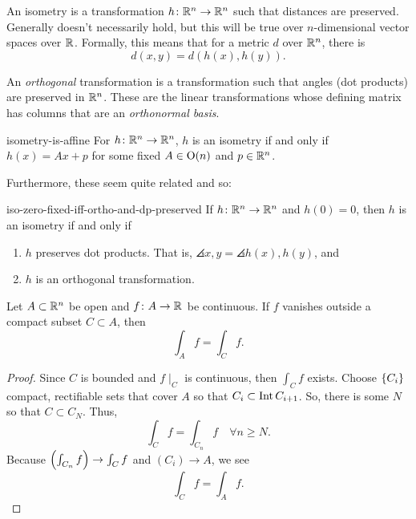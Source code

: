 \documentclass{article}
\begin{document}
An isometry is a transformation $h \from \RR[n] \to \RR[n]$ such that distances are preserved.
Generally doesn't necessarily hold, but this will be true over $n$-dimensional vector spaces over $\RR$.
Formally, this means that for a metric $d$ over $\RR[n]$, there is
\[ d(x, y) = d(h(x), h(y)). \]

An \emph{orthogonal} transformation is a transformation such that angles (dot products) are preserved in $\RR[n]$.
These are the linear transformations whose defining matrix has columns that are an \emph{orthonormal basis}.

\begin{theorem}{}{isometry-is-affine}
  For $h \from \RR[n] \to \RR[n]$, $h$ is an isometry if and only if $h(x) = Ax + p$
  for some fixed $A \in \Orth(n)$ and $p \in \RR[n]$.
\end{theorem}

Furthermore, these seem quite related and so:

\begin{theorem}{}{iso-zero-fixed-iff-ortho-and-dp-preserved}
  If $h \from \RR[n] \to \RR[n]$ and $h(0) = 0$, then $h$ is an isometry if and only if
  \begin{enumerate}[start=1,label={\arabic*\rparen}]
    \item $h$ preserves dot products. That is, $\angles{x, y} = \angles{h(x), h(y)}$, and
    \item $h$ is an orthogonal transformation.
  \end{enumerate}
\end{theorem}

\begin{lemma}{}{}
  Let $A \subset \RR[n]$ be open and $f \from A \to \RR$ be continuous.
  If $f$ vanishes outside a compact subset $C \subset A$, then
  \[ \int_{A}f = \int_{C}f. \]
\end{lemma}
\begin{proof}
  Since $C$ is bounded and $f\mid_{C}$ is continuous, then $\int_{C}f$ exists.
  Choose $\set{C_{i}}$ compact, rectifiable sets that cover $A$ so that $C_{i} \subset \Int C_{i + 1}$.
  So, there is some $N$ so that $C \subset C_{N}$.
  Thus,
  \[ \int_{C}f = \int_{C_{n}}f \quad\forall n \ge N. \]
  Because $\pars*{\int_{C_{n}}f} \to \int_{C}f$ and $(C_{i}) \to A$, we see
  \[ \int_{C}f = \int_{A}f. \]
\end{proof}
\end{document}
